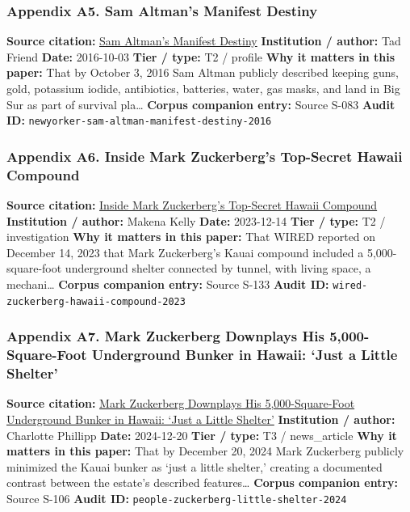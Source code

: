 \documentclass[
  american,
  11pt,
  letterpaper,
]{article}
\begin{document}
\subsubsection{Appendix A5. Sam Altman's Manifest
Destiny}\label{ch-09-appendix-a5-sam-altman-s-manifest-destiny}

\textbf{Source citation:}
\href{https://www.newyorker.com/magazine/2016/10/10/sam-altmans-manifest-destiny}{Sam
Altman's Manifest Destiny} \textbf{Institution / author:} Tad Friend
\textbf{Date:} 2016-10-03 \textbf{Tier / type:} T2 / profile \textbf{Why
it matters in this paper:} That by October 3, 2016 Sam Altman publicly
described keeping guns, gold, potassium iodide, antibiotics, batteries,
water, gas masks, and land in Big Sur as part of survival pla\ldots{}
\textbf{Corpus companion entry:} Source S-083 \textbf{Audit ID:}
\texttt{newyorker-sam-altman-manifest-destiny-2016}

\subsubsection{Appendix A6. Inside Mark Zuckerberg's Top-Secret Hawaii
Compound}\label{ch-09-appendix-a6-inside-mark-zuckerbergs-top-secret-hawaii-compound}

\textbf{Source citation:}
\href{https://www.wired.com/story/mark-zuckerberg-inside-hawaii-compound}{Inside
Mark Zuckerberg's Top-Secret Hawaii Compound} \textbf{Institution /
author:} Makena Kelly \textbf{Date:} 2023-12-14 \textbf{Tier / type:} T2
/ investigation \textbf{Why it matters in this paper:} That WIRED
reported on December 14, 2023 that Mark Zuckerberg's Kauai compound
included a 5,000-square-foot underground shelter connected by tunnel,
with living space, a mechani\ldots{} \textbf{Corpus companion entry:}
Source S-133 \textbf{Audit ID:}
\texttt{wired-zuckerberg-hawaii-compound-2023}

\subsubsection{Appendix A7. Mark Zuckerberg Downplays His
5,000-Square-Foot Underground Bunker in Hawaii: `Just a Little
Shelter'}\label{ch-09-appendix-a7-mark-zuckerberg-downplays-his-5-000-square-foot-underground-bunker-in-hawaii-just-a-little-shelter}

\textbf{Source citation:}
\href{https://people.com/mark-zuckerberg-hawaii-bunker-5000-square-feet-8765376}{Mark
Zuckerberg Downplays His 5,000-Square-Foot Underground Bunker in Hawaii:
`Just a Little Shelter'} \textbf{Institution / author:} Charlotte
Phillipp \textbf{Date:} 2024-12-20 \textbf{Tier / type:} T3 /
news\_article \textbf{Why it matters in this paper:} That by December
20, 2024 Mark Zuckerberg publicly minimized the Kauai bunker as `just a
little shelter,' creating a documented contrast between the estate's
described features\ldots{} \textbf{Corpus companion entry:} Source S-106
\textbf{Audit ID:} \texttt{people-zuckerberg-little-shelter-2024}
\end{document}
